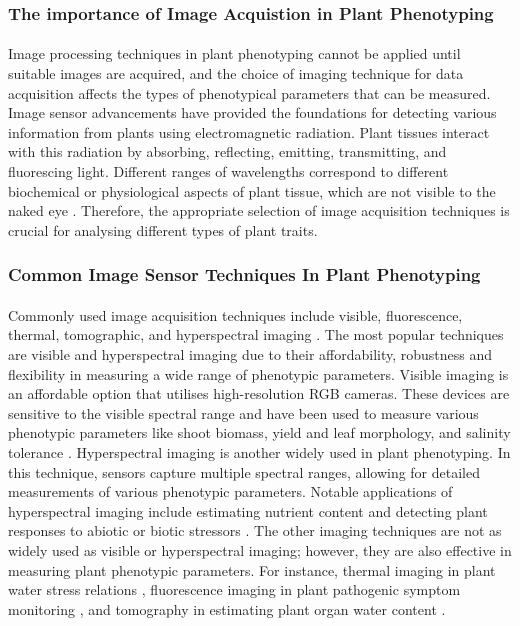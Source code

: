 \subsubsection{The importance of Image Acquistion in Plant Phenotyping}
\paragraph{}
Image processing techniques in plant phenotyping cannot be applied until suitable images are acquired, and the choice of imaging technique for data acquisition affects the types of phenotypical parameters that can be measured. Image sensor advancements have provided the foundations for detecting various information from plants using electromagnetic radiation. Plant tissues interact with this radiation by absorbing, reflecting, emitting, transmitting, and fluorescing light. Different ranges of wavelengths correspond to different biochemical or physiological aspects of plant tissue, which are not visible to the naked eye \cite{liReviewImagingTechniques2014}. Therefore, the appropriate selection of image acquisition techniques is crucial for analysing different types of plant traits.

\subsubsection{Common Image Sensor Techniques In Plant Phenotyping}
\paragraph{}
Commonly used image acquisition techniques include visible, fluorescence, thermal, tomographic, and hyperspectral imaging \cite{qiuSensorsMeasuringPlant2018, liReviewImagingTechniques2014}. The most popular techniques are visible and hyperspectral imaging due to their affordability, robustness and flexibility in measuring a wide range of phenotypic parameters. Visible imaging is an affordable option that utilises high-resolution RGB cameras. These devices are sensitive to the visible spectral range and have been used to measure various phenotypic parameters like shoot biomass, yield and leaf morphology, and salinity tolerance \cite{golzarianAccurateInferenceShoot2011, hoyos-villegasGroundBasedDigitalImaging2014}. Hyperspectral imaging is another widely used in plant phenotyping. In this technique, sensors capture multiple spectral ranges, allowing for detailed measurements of various phenotypic parameters. Notable applications of hyperspectral imaging include estimating nutrient content and detecting plant responses to abiotic or biotic stressors \cite{saricApplicationsHyperspectralImaging2022}. The other imaging techniques are not as widely used as visible or hyperspectral imaging; however, they are also effective in measuring plant phenotypic parameters. For instance, thermal imaging in plant water stress relations \cite{liReviewImagingTechniques2014, ishimweApplicationsThermalImaging2014}, fluorescence imaging in plant pathogenic symptom monitoring \cite{lichtenthalerRoleChlorophyllFluorescence1988, swarbrickMetabolicConsequencesSusceptibility2006}, and tomography in estimating plant organ water content \cite{windtMRILongdistanceWater2006}.

